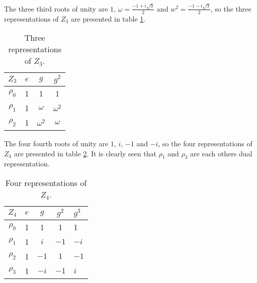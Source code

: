 		\begin{example}
			The three third roots of unity are $1$, $\omega = \frac{-1+i\sqrt{3}}{2}$ and $w^2 = \frac{-1-i\sqrt{3}}{2}$, so the three representations of $Z_3$ are presented in table \ref{table:Z3}.
			
			\begin{table}[hbt!]
				\label{table:Z3}
				\begin{tabular}{c | c c c}
					$Z_3$ & $e$ & $g$        & $g^2$      \\ \hline
					$\rho_0$          & 1   & 1          & 1          \\
					$\rho_1$          & 1   & $\omega$   & $\omega^2$ \\
					$\rho_2$          & 1   & $\omega^2$ & $\omega$
				\end{tabular}
				\centering
				\caption{Three representations of $Z_3$.}
			\end{table}
		\end{example}
		
		\begin{example}
			The four fourth roots of unity are $1$, $i$, $-1$ and $-i$, so the four representations of $Z_4$ are presented in table \ref{table:Z4}. It is clearly seen that $\rho_1$ and $\rho_3$ are each others dual representation.  
			
			\begin{table}[hbt!]
				\begin{tabular}{c | c c cl}
					\label{table:Z4}
					$Z_4$ & $e$ & $g$  & $g^2$ & $g^3$ \\ \hline
					         $\rho_0$           & 1   & 1    & 1     & 1     \\
					         $\rho_1$           & 1   & $i$  & $-1$  & $-i$  \\
					         $\rho_2$           & 1   & $-1$ & $1$  & $-1$   \\
					         $\rho_3$           & 1   & $-i$ & $-1$   & $i$
				\end{tabular}
				\centering
				\caption{Four representations of $Z_4$.}
			\end{table}
		\end{example}
		
